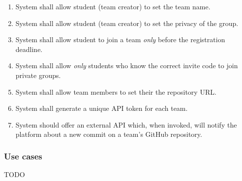 \begin{enumerate}[label=$\bullet$ \textbf{R\arabic*:}]
    \item System shall allow student (team creator) to set the team name.
    \item System shall allow student (team creator) to set the privacy of the group.
    \item System shall allow student to join a team \textit{only} before the registration deadline.
    \item System shall allow \textit{only} students who know the correct invite code to join private groups.
    \item System shall allow team members to set their the repository URL.
    \item System shall generate a unique API token for each team.
    \item System should offer an external API which, when invoked, will notify the platform about a new commit on a team’s GitHub repository.
\end{enumerate}
\subsubsection{Use cases}
TODO
